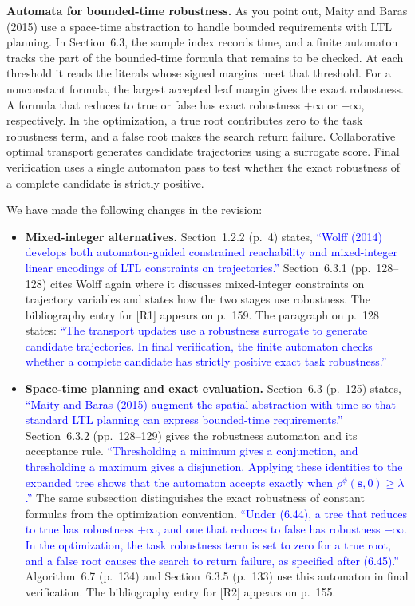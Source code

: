 \documentclass[11pt]{article}
\newcommand{\change}[1]{\textcolor{blue}{#1}}
\begin{document}
\textbf{Automata for bounded-time robustness.} As you point out, Maity and Baras
(2015) use a space-time abstraction to handle bounded requirements with LTL
planning. In Section~6.3, the sample index records time, and a finite automaton
tracks the part of the bounded-time formula that remains to be checked. At each
threshold it reads the literals whose signed margins meet that threshold.
For a nonconstant formula, the largest accepted leaf margin gives the exact
robustness. A formula that reduces to true or false has exact robustness
$+\infty$ or $-\infty$, respectively. In the optimization, a true root contributes
zero to the task robustness term, and a false root makes the search return failure.
Collaborative optimal transport generates candidate trajectories using a surrogate
score. Final verification uses a single automaton pass to test whether the exact
robustness of a complete candidate is strictly positive.

We have made the following changes in the revision:
\begin{itemize}
\item \textbf{Mixed-integer alternatives.} Section~1.2.2 (p.~4) states,
\change{``Wolff (2014) develops both automaton-guided constrained reachability
and mixed-integer linear encodings of LTL constraints on trajectories.''}
Section~6.3.1 (pp.~128--128) cites Wolff again where it discusses mixed-integer
constraints on trajectory variables and states how the two stages use robustness.
The bibliography entry for [R1] appears on p.~159.
The paragraph on p.~128 states:
\change{``The transport updates use a robustness surrogate to generate candidate
trajectories. In final verification, the finite automaton checks whether a complete
candidate has strictly positive exact task robustness.''}

\item \textbf{Space-time planning and exact evaluation.} Section~6.3 (p.~125)
states,
\change{``Maity and Baras (2015) augment the spatial abstraction with time so
that standard LTL planning can express bounded-time requirements.''}
Section~6.3.2 (pp.~128--129) gives the robustness automaton and its acceptance rule.
\change{``Thresholding a minimum gives a conjunction, and thresholding a maximum
gives a disjunction. Applying these identities to the expanded tree shows
that the automaton accepts exactly when $\rho^\phi(\mathbf{s},0)\geq\lambda$.''}
The same subsection distinguishes the exact robustness of constant formulas from
the optimization convention.
\change{``Under (6.44), a tree that reduces to true has robustness $+\infty$, and
one that reduces to false has robustness $-\infty$. In the optimization, the task
robustness term is set to zero for a true root, and a false root causes the search to
return failure, as specified after (6.45).''}
Algorithm~6.7 (p.~134) and Section~6.3.5 (p.~133) use this automaton in final
verification.
The bibliography entry for [R2] appears on p.~155.
\end{itemize}
\end{document}
